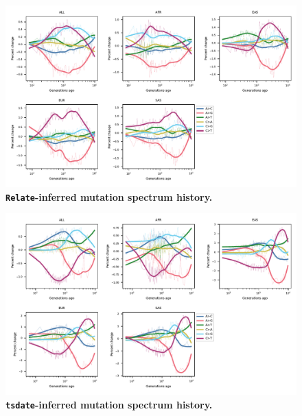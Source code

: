 \documentclass[]{article}
\newcommand{\tsdate}{\texttt{tsdate}\xspace}
\newcommand{\relate}{\texttt{Relate}\xspace}
\begin{document}
\begin{figure}[ht!]
    \centering
    \includegraphics[width=\textwidth]{../plots/spectrum_history.relate.max_age.10000.pdf}
    \caption{
        \textbf{\relate-inferred mutation spectrum history.}
    }
    \label{fig:relate-spectra}
\end{figure}


\begin{figure}[ht!]
    \centering
    \includegraphics[width=\textwidth]{../plots/spectrum_history.tsdate.max_age.10000.pdf}
    \caption{
        \textbf{\tsdate-inferred mutation spectrum history.}
    }
    \label{fig:tsdate-spectra}
\end{figure}
\end{document}
